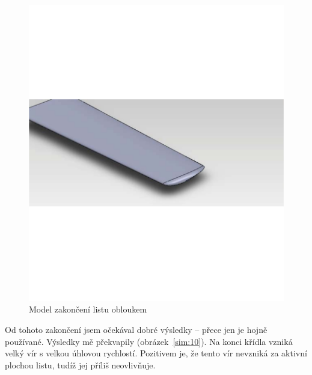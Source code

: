 \begin{figure}[H]
	\centering
	\includegraphics[]{obrazky/simulace/konec4p}
	\caption{Model zakončení listu obloukem}
	\label{konec:4}
\end{figure}

Od tohoto zakončení jsem očekával dobré výsledky – přece jen je hojně používané. Výsledky mě překvapily (obrázek~\ref{sim:10}). Na konci křídla vzniká velký vír s velkou úhlovou rychlostí. Pozitivem je, že tento vír nevzniká za aktivní plochou listu, tudíž jej příliš neovlivňuje.

